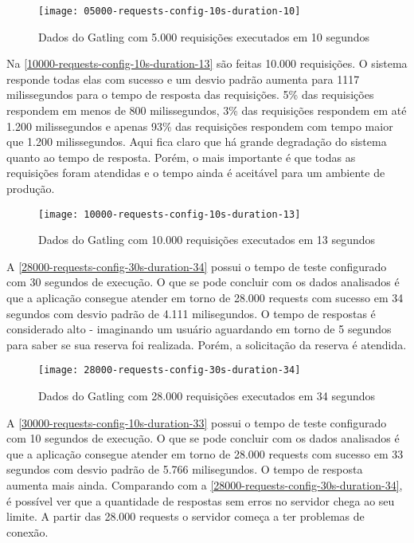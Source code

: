 \begin{figure}[h]
  \texttt{[image: 05000-requests-config-10s-duration-10]}
  \caption{Dados do Gatling com 5.000 requisições executados em 10 segundos}
  \label{05000-requests-config-10s-duration-10}
\end{figure}

Na \autoref{10000-requests-config-10s-duration-13} são feitas 10.000 requisições.
O sistema responde todas elas com sucesso e um desvio padrão aumenta para 1117 milissegundos
para o tempo de resposta das requisições.
5\% das requisições respondem em menos de 800 milissegundos, 3\% das requisições
respondem em até 1.200 milissegundos e apenas 93\% das requisições
respondem com tempo maior que 1.200 milissegundos. Aqui fica claro que há grande
degradação do sistema quanto ao tempo de resposta. Porém, o mais importante
é que todas as requisições foram atendidas e o tempo ainda é aceitável para
um ambiente de produção.

\begin{figure}[h]
  \texttt{[image: 10000-requests-config-10s-duration-13]}
  \caption{Dados do Gatling com 10.000 requisições executados em 13 segundos}
  \label{10000-requests-config-10s-duration-13}
\end{figure}

A \autoref{28000-requests-config-30s-duration-34} possui o tempo de teste configurado
com 30 segundos de execução.
O que se pode concluir com os dados analisados é que a aplicação consegue atender
em torno de 28.000 requests com sucesso em 34 segundos com desvio padrão de
4.111 milisegundos.
O tempo de respostas é considerado alto - imaginando um usuário aguardando em
torno de 5 segundos para saber se sua reserva foi realizada.
Porém, a solicitação da reserva é atendida.

\begin{figure}[h]
  \texttt{[image: 28000-requests-config-30s-duration-34]}
  \caption{Dados do Gatling com 28.000 requisições executados em 34 segundos}
  \label{28000-requests-config-30s-duration-34}
\end{figure}

A \autoref{30000-requests-config-10s-duration-33} possui o tempo de teste configurado
com 10 segundos de execução.
O que se pode concluir com os dados analisados é que a aplicação consegue atender
em torno de 28.000 requests com sucesso em 33 segundos com desvio padrão de
5.766 milisegundos.
O tempo de resposta aumenta mais ainda.
Comparando com a \autoref{28000-requests-config-30s-duration-34}, é possível ver
que a quantidade de respostas sem erros no servidor chega ao seu limite.
A partir das 28.000 requests o servidor começa a ter problemas de conexão.

